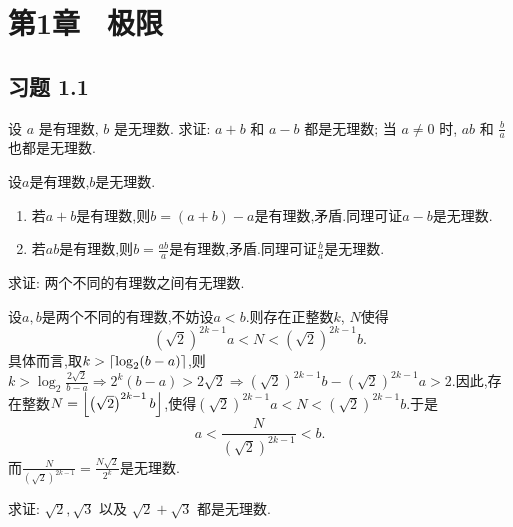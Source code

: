 \chapter*{第1章 \ 极限}

\section*{习题 1.1}

\begin{exercise}[1.1.1]
    设 $a$ 是有理数, $b$ 是无理数. 求证: $a+b$ 和 $a-b$ 都是无理数; 当 $a \ne 0$ 时, $ab$ 和 $\frac{b}{a}$ 也都是无理数.
\end{exercise}

\begin{solution}
    设$a$是有理数,$b$是无理数.
    \begin{enumerate}[(1)]
        \item 若$a+b$是有理数,则$b = (a+b)-a$是有理数,矛盾.同理可证$a-b$是无理数.
        \item 若$ab$是有理数,则$b = \frac{ab}{a}$是有理数,矛盾.同理可证$\frac{b}{a}$是无理数.
    \end{enumerate}
\end{solution}

\begin{exercise}[1.1.2]
    求证: 两个不同的有理数之间有无理数.
\end{exercise}

\begin{solution}
    设$a,b$是两个不同的有理数,不妨设$a < b$.则存在正整数$k$, $N$使得
    $$\left( \sqrt{2} \right)^{2k-1} a < N < \left( \sqrt{2} \right)^{2k-1} b.$$
    具体而言,取$k > \llceil \log_2 (b-a) \rrceil$,则$k > \log_2 \frac{2 \sqrt{2}}{b-a} \Rightarrow 2^k(b-a) > 2 \sqrt{2} \Rightarrow \left( \sqrt{2} \right)^{2k-1} b - \left( \sqrt{2} \right)^{2k-1} a > 2$.因此,存在整数$N = \llfloor \left( \sqrt{2} \right)^{2k-1} b \rrfloor$,使得$\left( \sqrt{2} \right)^{2k-1} a < N < \left( \sqrt{2} \right)^{2k-1} b$.于是
    $$a < \frac{N}{\left( \sqrt{2} \right)^{2k-1}} < b.$$
    而$\frac{N}{\left( \sqrt{2} \right)^{2k-1}} = \frac{N \sqrt{2}}{2^k}$是无理数.
\end{solution}

\begin{exercise}[1.1.3]
    求证: $\sqrt{2}, \sqrt{3}$ 以及 $\sqrt{2}+\sqrt{3}$ 都是无理数.
\end{exercise}


